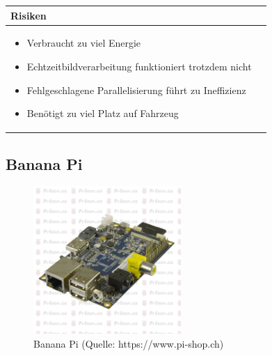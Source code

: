 \begin{table}[h]
\begin{tabular}{p{}p{}}


 \textbf{Risiken} & \\ \hline
	 
\begin{itemize}
\item Verbraucht zu viel Energie
\item Echtzeitbildverarbeitung funktioniert trotzdem nicht
\item Fehlgeschlagene Parallelisierung führt zu Ineffizienz
\item Benötigt zu viel Platz auf Fahrzeug
\end{itemize}


 
\end{tabular}
\end{table}

\pagebreak

\subsection{Banana Pi}

\begin{figure}[h!]%
\centering
\includegraphics[width=0.5\textwidth]{fig/PIBanana.jpg}
\caption{Banana Pi (Quelle: https://www.pi-shop.ch)}
\label{fig:Banana Pi}
\end{figure}

